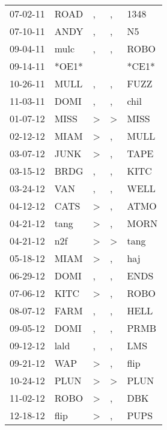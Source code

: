 \begin{supertabular}{lllll}
 07-02-11 &   ROAD &                , &                , &   1348 \\
 07-10-11 &   ANDY &                , &                , &     N5 \\
 09-04-11 &   mulc &                , &                , &   ROBO \\
 09-14-11 &  *OE1* &                  &                  &  *CE1* \\
 10-26-11 &   MULL &                , &                , &   FUZZ \\
 11-03-11 &   DOMI &                , &                , &   chil \\
 01-07-12 &   MISS &     \textgreater &     \textgreater &   MISS \\
 02-12-12 &   MIAM &     \textgreater &                , &   MULL \\
 03-07-12 &   JUNK &     \textgreater &                , &   TAPE \\
 03-15-12 &   BRDG &                , &                , &   KITC \\
 03-24-12 &    VAN &                , &                , &   WELL \\
 04-12-12 &   CATS &     \textgreater &                , &   ATMO \\
 04-21-12 &   tang &     \textgreater &                , &   MORN \\
 04-21-12 &    n2f &     \textgreater &     \textgreater &   tang \\
 05-18-12 &   MIAM &     \textgreater &                , &    haj \\
 06-29-12 &   DOMI &                , &                , &   ENDS \\
 07-06-12 &   KITC &     \textgreater &                , &   ROBO \\
 08-07-12 &   FARM &                , &                , &   HELL \\
 09-05-12 &   DOMI &                , &                , &   PRMB \\
 09-12-12 &   lald &                , &                , &    LMS \\
 09-21-12 &    WAP &     \textgreater &                , &   flip \\
 10-24-12 &   PLUN &     \textgreater &     \textgreater &   PLUN \\
 11-02-12 &   ROBO &     \textgreater &                , &    DBK \\
 12-18-12 &   flip &     \textgreater &                , &   PUPS \\

\end{supertabular}
